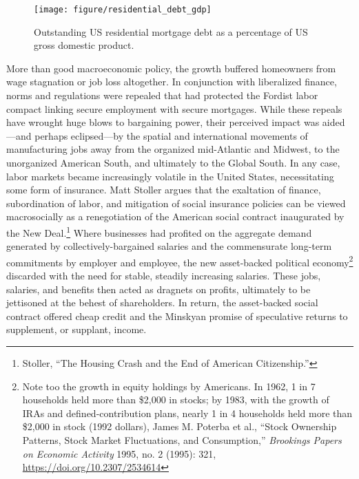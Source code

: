 \documentclass[12pt,oneside]{psthesis}
\begin{document}
\begin{figure}

{\centering \texttt{[image: figure/residential\_debt\_gdp]} 

}

\caption{Outstanding US residential mortgage debt as a percentage of US gross domestic product.}\label{fig:hhdebt}
\end{figure}
More than good macroeconomic policy, the growth buffered homeowners from wage stagnation or job loss altogether.
In conjunction with liberalized finance, norms and regulations were repealed that had protected the Fordist labor compact linking secure employment with secure mortgages.
While these repeals have wrought huge blows to bargaining power, their perceived impact was aided---and perhaps eclipsed---by the spatial and international movements of manufacturing jobs away from the organized mid-Atlantic and Midwest, to the unorganized American South, and ultimately to the Global South.
In any case, labor markets became increasingly volatile in the United States, necessitating some form of insurance.
Matt Stoller argues that the exaltation of finance, subordination of labor, and mitigation of social insurance policies can be viewed macrosocially as a renegotiation of the American social contract inaugurated by the New Deal.\footnote{Stoller, ``The Housing Crash and the End of American Citizenship.''}
Where businesses had profited on the aggregate demand generated by collectively-bargained salaries and the commensurate long-term commitments by employer and employee, the new asset-backed political economy\footnote{Note too the growth in equity holdings by Americans. In 1962, 1 in 7 households held more than \$2,000 in stocks; by 1983, with the growth of IRAs and defined-contribution plans, nearly 1 in 4 households held more than \$2,000 in stock (1992 dollars), James M. Poterba et al., ``Stock Ownership Patterns, Stock Market Fluctuations, and Consumption,'' \emph{Brookings Papers on Economic Activity} 1995, no. 2 (1995): 321, \url{https://doi.org/10.2307/2534614}} discarded with the need for stable, steadily increasing salaries.
These jobs, salaries, and benefits then acted as dragnets on profits, ultimately to be jettisoned at the behest of shareholders.
In return, the asset-backed social contract offered cheap credit and the Minskyan promise of speculative returns to supplement, or supplant, income.
\end{document}
